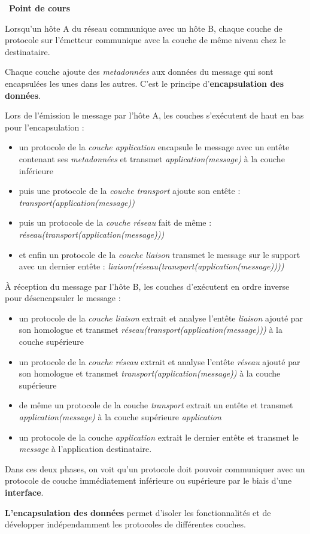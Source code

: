 \documentclass[
  11pt,
]{article}
\providecommand{\tightlist}{%
  \setlength{\itemsep}{0pt}\setlength{\parskip}{0pt}}
\newcounter{cours}
\newenvironment{cours}[1]
{\par \medskip   \addtocounter{cours}{1} \noindent  
\begin{bclogo}[arrondi =0.1,  ombre = true, barre=none, logo=\bcbook, marge=4]{~\textbf{Point de cours} \textbf{\thecours} {\itshape #1} }  \par}
{
\end{bclogo}
 \par \bigskip }
\begin{document}
\begin{cours}{}
Lorsqu'un hôte A du réseau communique avec un hôte B, chaque couche de
protocole sur l'émetteur communique avec la couche de même niveau chez
le destinataire.

Chaque couche ajoute des \emph{metadonnées} aux données du message qui
sont encapsulées les unes dans les autres. C'est le principe
d'\textbf{encapsulation des données}.

Lors de l'émission le message par l'hôte A, les couches s'exécutent de
haut en bas pour l'encapsulation :

\begin{itemize}
\tightlist
\item
  un protocole de la \emph{couche application} encapsule le message avec
  un entête contenant ses \emph{metadonnées} et transmet
  \emph{application(message)} à la couche inférieure
\item
  puis une protocole de la \emph{couche transport} ajoute son entête :
  \emph{transport(application(message))}
\item
  puis un protocole de la \emph{couche réseau} fait de même :
  \emph{réseau(transport(application(message)))}
\item
  et enfin un protocole de la \emph{couche liaison} transmet le message
  sur le support avec un dernier entête :
  \emph{liaison(réseau(transport(application(message))))}
\end{itemize}

À réception du message par l'hôte B, les couches d'exécutent en ordre
inverse pour désencapsuler le message :

\begin{itemize}
\tightlist
\item
  un protocole de la \emph{couche liaison} extrait et analyse l'entête
  \emph{liaison} ajouté par son homologue et transmet
  \emph{réseau(transport(application(message)))} à la couche supérieure
\item
  un protocole de la \emph{couche réseau} extrait et analyse l'entête
  \emph{réseau} ajouté par son homologue et transmet
  \emph{transport(application(message))} à la couche supérieure
\item
  de même un protocole de la couche \emph{transport} extrait un entête
  et transmet \emph{application(message)} à la couche supérieure
  \emph{application}
\item
  un protocole de la couche \emph{application} extrait le dernier entête
  et transmet le \emph{message} à l'application destinataire.
\end{itemize}

Dans ces deux phases, on voit qu'un protocole doit pouvoir communiquer
avec un protocole de couche immédiatement inférieure ou supérieure par
le biais d'une \textbf{interface}.

\textbf{L'encapsulation des données} permet d'isoler les fonctionnalités
et de développer indépendamment les protocoles de différentes couches.

\end{cours}
\end{document}
